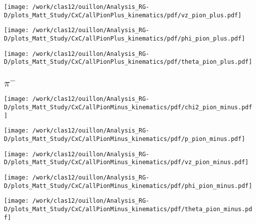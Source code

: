 \documentclass{report}
\begin{document}
    \begin{minipage}{.5\textwidth}
        \centering
        \texttt{[image: /work/clas12/ouillon/Analysis\_RG-D/plots\_Matt\_Study/CxC/allPionPlus\_kinematics/pdf/vz\_pion\_plus.pdf]}
    \end{minipage}
    \begin{minipage}{.5\textwidth}
        \centering
        \texttt{[image: /work/clas12/ouillon/Analysis\_RG-D/plots\_Matt\_Study/CxC/allPionPlus\_kinematics/pdf/phi\_pion\_plus.pdf]}
    \end{minipage}

    \begin{minipage}{.5\textwidth}
        \centering
        \texttt{[image: /work/clas12/ouillon/Analysis\_RG-D/plots\_Matt\_Study/CxC/allPionPlus\_kinematics/pdf/theta\_pion\_plus.pdf]}
    \end{minipage}
    \begin{minipage}{.5\textwidth}
    \end{minipage}

    \subsection{\(\pi^-\)}
    \begin{minipage}{.5\textwidth}
        \centering
        \texttt{[image: /work/clas12/ouillon/Analysis\_RG-D/plots\_Matt\_Study/CxC/allPionMinus\_kinematics/pdf/chi2\_pion\_minus.pdf]}
    \end{minipage}
    \begin{minipage}{.5\textwidth}
        \centering
        \texttt{[image: /work/clas12/ouillon/Analysis\_RG-D/plots\_Matt\_Study/CxC/allPionMinus\_kinematics/pdf/p\_pion\_minus.pdf]}
    \end{minipage}

    \begin{minipage}{.5\textwidth}
        \centering
        \texttt{[image: /work/clas12/ouillon/Analysis\_RG-D/plots\_Matt\_Study/CxC/allPionMinus\_kinematics/pdf/vz\_pion\_minus.pdf]}
    \end{minipage}
    \begin{minipage}{.5\textwidth}
        \centering
        \texttt{[image: /work/clas12/ouillon/Analysis\_RG-D/plots\_Matt\_Study/CxC/allPionMinus\_kinematics/pdf/phi\_pion\_minus.pdf]}
    \end{minipage}

    \begin{minipage}{.5\textwidth}
        \centering
        \texttt{[image: /work/clas12/ouillon/Analysis\_RG-D/plots\_Matt\_Study/CxC/allPionMinus\_kinematics/pdf/theta\_pion\_minus.pdf]}
    \end{minipage}
    \begin{minipage}{.5\textwidth}
    \end{minipage}
\end{document}
